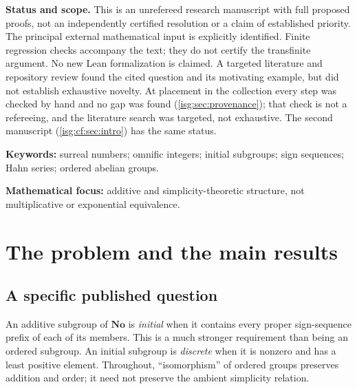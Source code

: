 \documentclass[11pt]{article}
\theoremstyle{definition}
\theoremstyle{remark}
\newcommand{\No}{\ensuremath{\mathbf{No}}}
\newcommand{\Z}{\mathbb{Z}}
\begin{document}
\begin{titlepage}
\begin{abstract}
A second manuscript realizes every convex subquotient of an initially
realizable group by sign-tree compression, and shows that a Presburger
group is initially realizable exactly when its residues in
$\widehat{\Z}$ are ordinary integers.
\end{abstract}
\vspace{2mm}
\begin{statusbox}
\textbf{Status and scope.} This is an unrefereed research manuscript with
full proposed proofs, not an independently certified resolution or a
claim of established priority. The principal external mathematical input
is explicitly identified. Finite regression checks accompany the text;
they do not certify the transfinite argument. No new Lean formalization
is claimed. A targeted literature and repository review found the cited
question and its motivating example, but did not establish exhaustive
novelty. At placement in the collection every step was checked by hand
and no gap was found (\cref{isg:sec:provenance}); that check is not a
refereeing, and the literature search was targeted, not exhaustive.
The second manuscript (\cref{isg:cf:sec:intro}) has the same status.
\end{statusbox}
\vfill
{\small\textbf{Keywords:} surreal numbers; omnific integers; initial
subgroups; sign sequences; Hahn series; ordered abelian groups.\par
\textbf{Mathematical focus:} additive and simplicity-theoretic structure,
not multiplicative or exponential equivalence.}
\end{titlepage}
\hypersetup{pageanchor=true}

\begingroup
\small
\setlength{\parskip}{0pt}
\tableofcontents
\endgroup
\newpage

\section{The problem and the main results}\label{isg:sec:intro}

\subsection{A specific published question}
An additive subgroup of $\No$ is \emph{initial} when it contains every
proper sign-sequence prefix of each of its members. This is a much stronger
requirement than being an ordered subgroup. An initial subgroup is
\emph{discrete} when it is nonzero and has a least positive element.
Throughout, ``isomorphism'' of ordered groups preserves addition and
order; it need not preserve the ambient simplicity relation.
\end{document}
